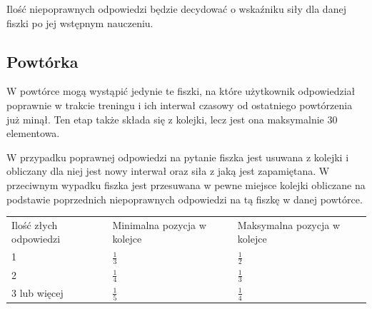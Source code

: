Ilość niepoprawnych odpowiedzi będzie decydować o wskaźniku siły dla danej fiszki po jej wstępnym nauczeniu.

\subsection{Powtórka}

W powtórce mogą wystąpić jedynie te fiszki, na które użytkownik odpowiedział poprawnie w trakcie treningu i ich interwał czasowy od ostatniego powtórzenia już minął. Ten etap także składa się z kolejki, lecz jest ona maksymalnie 30 elementowa. 

W przypadku poprawnej odpowiedzi na pytanie fiszka jest usuwana z kolejki i obliczany dla niej jest nowy interwał oraz siła z jaką jest zapamiętana. W przeciwnym wypadku fiszka jest przesuwana w pewne miejsce kolejki obliczane na podstawie poprzednich niepoprawnych odpowiedzi na tą fiszkę w danej powtórce.


\begin{center}
\begin{tabular}{| l | l | l |}
\hline
Ilość złych odpowiedzi  & Minimalna pozycja w kolejce & Maksymalna pozycja w kolejce \\ \Xhline{3\arrayrulewidth}

1 & $\frac{1}{3}$ & $\frac{1}{2}$   \\ \hline
2 & $\frac{1}{4}$  & $\frac{1}{3}$   \\ \hline
3 lub więcej & $\frac{1}{5}$   & $\frac{1}{4}$   \\ \hline
\end{tabular}
\label{table:internals}

\end{center}

